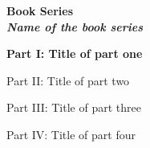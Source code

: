 

\vspace{1cm}
\thispagestyle{empty}


\parbox{0.9\textwidth}{
  \begin{center}
	\bfseries \sffamily \LARGE Book Series\\
    \textit{Name of the book series}
  \end{center}
}

\begin{center}

\vspace{1cm}    
\vspace{1cm}

\sffamily \textbf{Part I: Title of part one}

\sffamily Part II: Title of part two

\sffamily Part III: Title of part three

\sffamily Part IV: Title of part four

\end{center}



\newpage